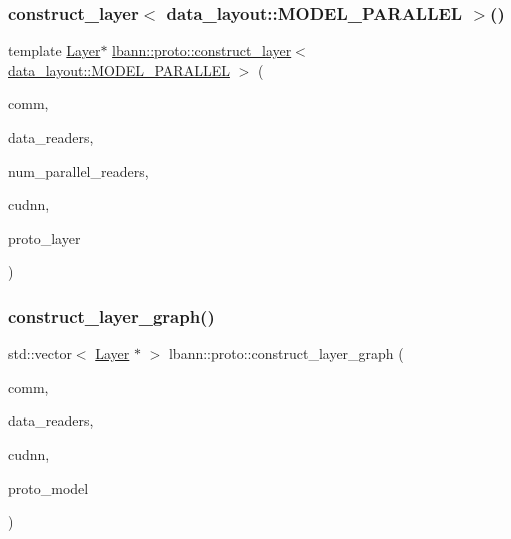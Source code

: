 \subsubsection{\texorpdfstring{construct\+\_\+layer$<$ data\+\_\+layout\+::\+M\+O\+D\+E\+L\+\_\+\+P\+A\+R\+A\+L\+L\+E\+L $>$()}{construct\_layer< data\_layout::MODEL\_PARALLEL >()}}
{\footnotesize\ttfamily template \hyperlink{classlbann_1_1Layer}{Layer}$\ast$ \hyperlink{namespacelbann_1_1proto_a7e4b0a66836712b1713ae4a121453cde}{lbann\+::proto\+::construct\+\_\+layer}$<$ \hyperlink{base_8hpp_a786677cbfb3f5677b4d84f3056eb08dbac94d7b0e44ab8bdcdad694a673cdeae0}{data\+\_\+layout\+::\+M\+O\+D\+E\+L\+\_\+\+P\+A\+R\+A\+L\+L\+EL} $>$ (\begin{DoxyParamCaption}\item[{\hyperlink{classlbann_1_1lbann__comm}{lbann\+\_\+comm} $\ast$}]{comm,  }\item[{std\+::map$<$ \hyperlink{base_8hpp_a2781a159088df64ed7d47cc91c4dc0a8}{execution\+\_\+mode}, \hyperlink{classlbann_1_1generic__data__reader}{generic\+\_\+data\+\_\+reader} $\ast$$>$ \&}]{data\+\_\+readers,  }\item[{int}]{num\+\_\+parallel\+\_\+readers,  }\item[{\hyperlink{classlbann_1_1cudnn_1_1cudnn__manager}{cudnn\+::cudnn\+\_\+manager} $\ast$}]{cudnn,  }\item[{const lbann\+\_\+data\+::\+Layer \&}]{proto\+\_\+layer }\end{DoxyParamCaption})}

\mbox{\label{namespacelbann_1_1proto_a99e65cd4abb769d020ab76ff20c39d0b}} 
\subsubsection{\texorpdfstring{construct\+\_\+layer\+\_\+graph()}{construct\_layer\_graph()}}
{\footnotesize\ttfamily std\+::vector$<$ \hyperlink{classlbann_1_1Layer}{Layer} $\ast$ $>$ lbann\+::proto\+::construct\+\_\+layer\+\_\+graph (\begin{DoxyParamCaption}\item[{\hyperlink{classlbann_1_1lbann__comm}{lbann\+\_\+comm} $\ast$}]{comm,  }\item[{std\+::map$<$ \hyperlink{base_8hpp_a2781a159088df64ed7d47cc91c4dc0a8}{execution\+\_\+mode}, \hyperlink{classlbann_1_1generic__data__reader}{generic\+\_\+data\+\_\+reader} $\ast$ $>$ \&}]{data\+\_\+readers,  }\item[{\hyperlink{classlbann_1_1cudnn_1_1cudnn__manager}{cudnn\+::cudnn\+\_\+manager} $\ast$}]{cudnn,  }\item[{const lbann\+\_\+data\+::\+Model \&}]{proto\+\_\+model }\end{DoxyParamCaption})}


